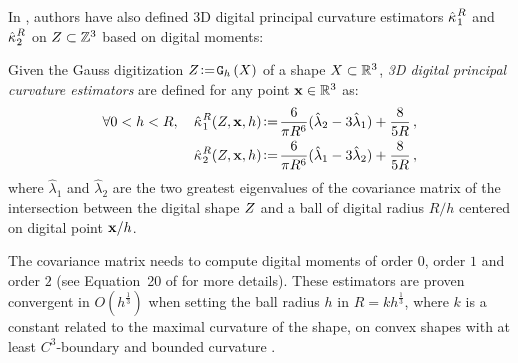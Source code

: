 \documentclass{llncs}
\begin{document}
In \cite{CVIU2014}, authors have also defined 3D digital principal curvature
estimators $\hat{\kappa_{}}_{1}^{R}$ and $\hat{\kappa_{}}_{2}^{R}$ on $Z\subset{\mathbb{Z}}^3$ based
on digital moments:
%
\begin{Definition}
  Given the Gauss digitization $Z \!\mathrel{\mathop:}=\! \mathtt{G}_{h}\left(X\right)$ of a shape $X \subset {\mathbb{R}}^3$,
  {\em 3D digital principal curvature estimators} are defined for any point $\mathbf{x}
  \in {\mathbb{R}}^3$ as:
  \begin{align}
    \forall 0 < h < R,\quad
    \hat{\kappa_{}}_{1}^{R}(Z,\mathbf{x},h) &\!\mathrel{\mathop:}=\! \frac{6}{\pi {R}^6}(\hat{\lambda}_2 - 3\hat{\lambda}_1) + \frac{8}{5 R} \,,\label{eq:dig-curvature-estimator-k1}\\
    \hat{\kappa_{}}_{2}^{R}(Z,\mathbf{x},h) &\!\mathrel{\mathop:}=\! \frac{6}{\pi {R}^6}(\hat{\lambda}_1 - 3\hat{\lambda}_2) + \frac{8}{5 R} \,,
    \label{eq:dig-curvature-estimator-k2}
  \end{align}
  where $\hat{\lambda}_1$ and $\hat{\lambda}_2$ are the two greatest eigenvalues
  of the covariance matrix of the intersection between the digital shape
  $Z$ and a ball of digital radius $R/h$ centered on digital point
  $\mathbf{x}/h$.
\end{Definition}
%
The covariance matrix needs to compute digital moments of order $0$, order $1$
and order $2$ (see Equation~20 of \cite{CVIU2014} for more details).
\color{blue}
These estimators are proven convergent in $O\left(h^{\frac{1}{3}}\right)$ when setting the ball
radius $h$ in $R = kh^\frac{1}{3}$, where $k$ is a constant related to the
maximal curvature of the shape, on convex shapes with at least $C^3$-boundary
and bounded curvature \cite{CVIU2014}.
\normalcolor 
\end{document}
